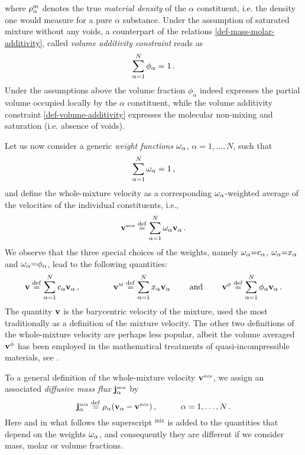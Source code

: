 \documentclass[a4paper]{article}
\begin{document}
where $\rho^{\rm m}_\alpha$ denotes the true {\it material density} of the $\alpha$ constituent, i.e. the density one would measure for a pure $\alpha$ substance. Under the assumption of saturated mixture without any voids, a counterpart of the relations \eqref{def-mass-molar-additivity}, called {\it volume additivity constraint} reads as
\begin{equation}
\label{def-volume-additivity}
\sum_{\alpha=1}^N \phi_\alpha = 1\,.
\end{equation}
Under the assumptions above the volume fraction $\phi_\alpha$ indeed expresses the partial volume occupied locally by the $\alpha$ constituent, while the volume additivity constraint \eqref{def-volume-additivity} expresses the molecular non-mixing and saturation (i.e. absence of voids). 

Let us now consider a generic {\it weight functions} $\omega_\alpha$, $\alpha=1,\dots,N$, such that
\begin{align}
\label{eq-suma-weight}
\sum_{\alpha=1}^N\omega_\alpha = 1\,,
\end{align}
and define the whole-mixture velocity as a corresponding $\omega_\alpha$-weighted average of the  velocities of the individual constituents, i.e.,
\begin{equation}
\label{def-vmix}
{\bf v}^{\mbox{\tiny{mix}}} \stackrel{\mathrm{def}}{=} \sum_{\alpha=1}^N\omega_\alpha{\bf v}_\alpha\,.
\end{equation}
We observe that the three special choices of the weights, namely $\omega_\alpha{=}c_\alpha$, $\omega_\alpha{=}x_\alpha$ and $\omega_\alpha{=}\phi_\alpha$, lead to the following quantities:
\begin{equation}
\label{def-velocities}
{\bf v}\stackrel{\mathrm{def}}{=} \sum_{\alpha=1}^N c_\alpha{\bf v}_\alpha\,,\qquad \qquad {\bf v}^{\mbox{\tiny{M}}}\stackrel{\mathrm{def}}{=}\sum_{\alpha=1}^Nx_\alpha{\bf v}_\alpha\qquad \textrm{ and } \qquad
{{\bf v}^{{\tiny{\phi}}}} \stackrel{\mathrm{def}}{=} \sum_{\alpha=1}^N\phi_\alpha{\bf v}_\alpha\,.
\end{equation}
The quantity ${\bf v}$ is the barycentric velocity of the mixture, used the most traditionally as a definition of the mixture velocity. The other two definitions of the whole-mixture velocity are perhaps less popular, albeit the volume averaged ${\bf v}^{{\tiny{\phi}}}$ has been employed in the mathematical treatments of quasi-incompressible materials, see \cite{abels2012,abels2013}.

To a general definition of the whole-mixture velocity ${\bf v}^{\mbox{\tiny{mix}}}$, we assign an associated {\it diffusive mass flux} ${\bf j}^{\mbox{\tiny{mix}}}_\alpha$ by
\begin{equation}
\label{def-diff-fluxes}
{\bf j}^{\mbox{\tiny{mix}}}_\alpha \stackrel{\mathrm{def}}{=} \rho_\alpha({\bf v}_\alpha - {\bf v}^{\mbox{\tiny{mix}}})\,,\hspace{1cm}\alpha=1,\dots,N\,.
\end{equation}
Here and in what follows the superscript $^{\textrm{mix}}$ is added to the quantities that depend on the weights $\omega_\alpha$, and consequently they are different if we consider mass, molar or volume fractions.
\end{document}
